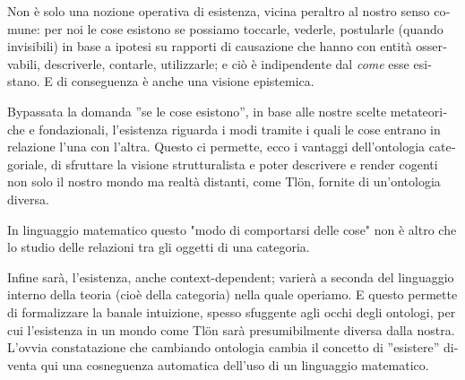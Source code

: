\begin{italian}
 	Non è solo una nozione operativa di esistenza, vicina peraltro al nostro senso comune: per noi le cose esistono se possiamo toccarle, vederle, postularle (quando invisibili) in base a ipotesi su rapporti di causazione che hanno con entità osservabili, descriverle, contarle, utilizzarle; e ciò è indipendente dal \emph{come} esse esistano. E di conseguenza è anche una visione epistemica.

 	Bypassata la domanda ''se le cose esistono'', in base alle nostre scelte metateoriche e fondazionali, l'esistenza riguarda i modi tramite i quali le cose entrano in relazione l'una con l'altra. Questo ci permette, ecco i vantaggi dell'ontologia categoriale, di sfruttare la visione strutturalista e poter descrivere e render cogenti non solo il nostro mondo ma realtà distanti, come Tl\"on, fornite di un'ontologia diversa.

 	In linguaggio matematico questo "modo di comportarsi delle cose" non è altro che lo studio delle relazioni tra gli oggetti di una categoria.

 	Infine sarà, l'esistenza, anche context-dependent; varierà a seconda del linguaggio interno della teoria (cioè della categoria) nella quale operiamo. E questo permette di formalizzare la banale intuizione, spesso sfuggente agli occhi degli ontologi, per cui l'esistenza in un mondo come Tl\"on sarà presumibilmente diversa dalla nostra. L'ovvia constatazione che cambiando ontologia cambia il concetto di ''esistere'' diventa qui una cosneguenza automatica dell'uso di un linguaggio matematico.
 \end{italian}
